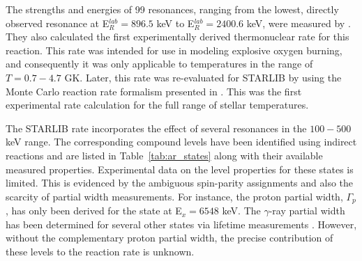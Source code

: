 \documentclass[twocolumn]{aastex6}
\begin{document}
The strengths and energies of 99 resonances, ranging from the lowest, directly observed resonance at E$_R^{lab}=896.5$ keV to E$_R^{lab}=2400.6$ keV, were measured by \citet{H_nninen_1984}. 
They also calculated the first experimentally derived thermonuclear rate for this reaction. 
This rate was intended for use in modeling explosive oxygen burning, and consequently it was only applicable to temperatures in the range of $T =0.7-4.7$ GK. Later, this rate was re-evaluated for STARLIB by \citet{Sallaska_2013} using the Monte Carlo reaction rate formalism presented in \citet{Longland_2010}. 
This was the first experimental rate calculation for the full range of stellar temperatures.
\par
The STARLIB rate incorporates the effect of several resonances in the $100-500$ keV range.
The corresponding compound levels have been identified using indirect reactions and are listed in Table~\ref{tab:ar_states} along with their available measured properties. 
Experimental data on the level properties for these states is limited. This is evidenced by the ambiguous spin-parity assignments and also the scarcity of partial width measurements.  For instance, the proton partial width, $\Gamma_p$, has only been derived for the state at E$_x=6548$ keV. The $\gamma$-ray partial width has been determined for several other states via lifetime measurements \citep{Nolan_1981,Moreh_1988}. However, without the complementary proton partial width, the precise contribution of these levels to the reaction rate is unknown. 
\par
\end{document}
